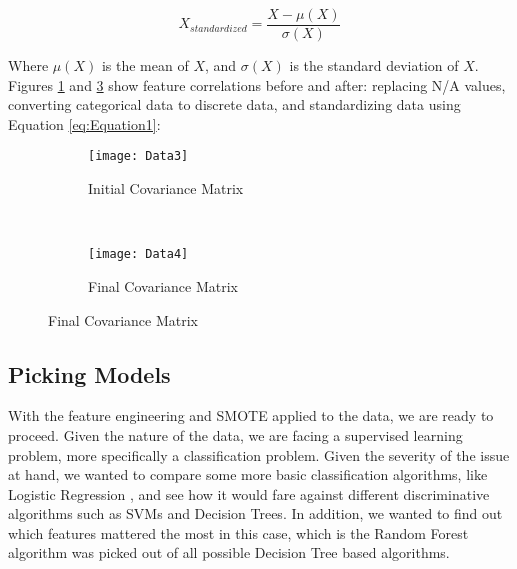 \begin{equation}
    \label{eq:Equation1}
    X_{standardized} = \dfrac{X - \mu(X)}{\sigma(X)}
\end{equation}

Where $\mu(X)$ is the mean of $X$, and $\sigma(X)$ is the standard deviation of $X$.\\

\noindent Figures \ref{fig:Figure3} and \ref{fig:Figure4} show feature correlations before and after: replacing N/A values, converting categorical data to discrete data, and standardizing data using Equation \eqref{eq:Equation1}:

\begin{figure}[H]
    \centering
    \begin{subfigure}[t]{.85\textwidth}
        \centering\texttt{[image: Data3]}
        \caption{Initial Covariance Matrix}
        \label{fig:Figure3}
    \end{subfigure}\\
    \begin{subfigure}[t]{.85\textwidth}
        \centering\texttt{[image: Data4]}
        \caption{Final Covariance Matrix}
        \label{fig:Figure4}
    \end{subfigure}
\end{figure}

\subsection{Picking Models}
\label{sec:methodology:Picking Models}

With the feature engineering and SMOTE applied to the data, we are ready to proceed. Given the nature of the data, we are facing a supervised learning problem, more specifically a classification problem. Given the severity of the issue at hand, we wanted to compare some more basic classification algorithms, like Logistic Regression \cite{Logistic_Regression}, and see how it would fare against different discriminative algorithms such as SVMs \cite{SVMs} and Decision Trees. In addition, we wanted to find out which features mattered the most in this case, which is the Random Forest algorithm was picked out of all possible Decision Tree based algorithms. 